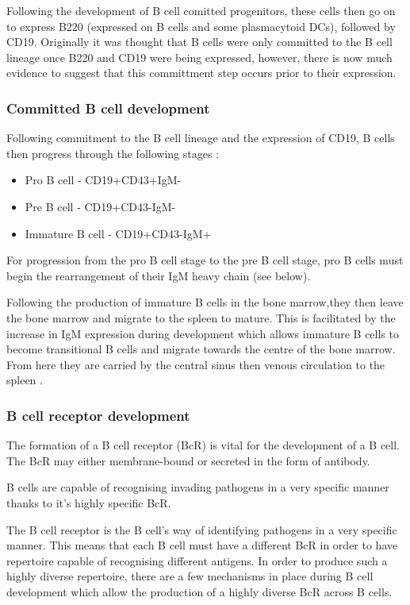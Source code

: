 Following the development of B cell comitted progenitors, these cells then go on to express B220 (expressed on B cells and some plasmacytoid DCs), followed by CD19.
Originally it was thought that B cells were only committed to the B cell lineage once B220 and CD19 were being expressed, however, there is now much evidence to suggest that this committment step occurs prior to their expression.


\subsubsection{Committed B cell development}

Following commitment to the B cell lineage and the expression of CD19, B cells then progress through the following stages \citep{Cambier2007}:
\begin{itemize}
\item Pro B cell - CD19+CD43+IgM-
\item Pre B cell - CD19+CD43-IgM-
\item Immature B cell - CD19+CD43-IgM+
\end{itemize}

For progression from the pro B cell stage to the pre B cell stage, pro B cells must begin the rearrangement of their IgM heavy chain (see below).

Following the production of immature B cells in the bone marrow,they then leave the bone marrow and migrate to the spleen to mature.
This is facilitated by the increase in IgM expression during development which allows immature B cells to become transitional B cells and migrate towards the centre of the bone marrow. 
From here they are carried by the central sinus then venous circulation to the spleen \citep{Loder1999}.


\subsubsection{B cell receptor development}
\label{subsubsec:Bcellrecepdevelopment}


The formation of a B cell receptor (BcR) is vital for the development of a B cell.
The BcR may either membrane-bound or secreted in the form of antibody.

B cells are capable of recognising invading pathogens in a very specific manner thanks to it's highly specific BcR.

The B cell receptor is the B cell's way of identifying pathogens in a very specific manner.
This means that each B cell must have a different BcR in order to have repertoire capable of recognising different antigens.
In order to produce such a highly diverse repertoire, there are a few mechanisms in place during B cell development which allow the production of a highly diverse BcR across B cells.

